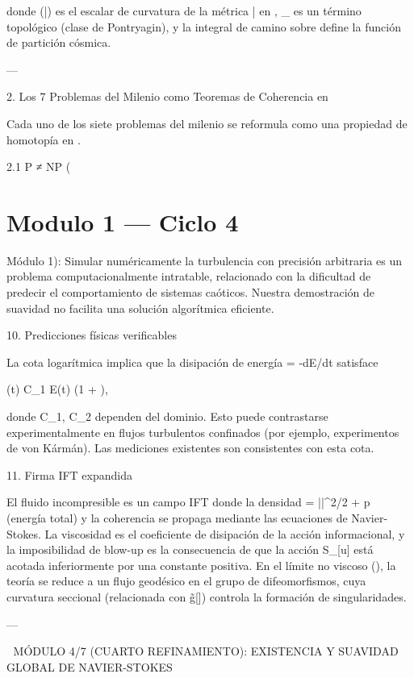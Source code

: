 \documentclass[12pt,twoside]{book}
\begin{document}
donde  (\bar{})  es el escalar de curvatura de la métrica  \bar{}  en   ,  _{}  es un término topológico (clase de Pontryagin), y la integral de camino sobre    define la función de partición cósmica.

---

2. Los 7 Problemas del Milenio como Teoremas de Coherencia en   

Cada uno de los siete problemas del milenio se reformula como una propiedad de homotopía en   .

2.1 P ≠ NP (

\chapter{Modulo 1 — Ciclo 4}
Módulo 1): Simular numéricamente la turbulencia con precisión arbitraria es un problema computacionalmente intratable, relacionado con la dificultad de predecir el comportamiento de sistemas caóticos. Nuestra demostración de suavidad no facilita una solución algorítmica eficiente.

10. Predicciones físicas verificables

La cota logarítmica implica que la disipación de energía \varepsilon = -dE/dt satisface

\varepsilon(t) \le C_1 \nu E(t) \ln\left(1 + \right),

donde C_1, C_2 dependen del dominio. Esto puede contrastarse experimentalmente en flujos turbulentos confinados (por ejemplo, experimentos de von Kármán). Las mediciones existentes son consistentes con esta cota.

11. Firma IFT expandida

El fluido incompresible es un campo IFT donde la densidad \rho = ||^2/2 + p (energía total) y la coherencia se propaga mediante las ecuaciones de Navier-Stokes. La viscosidad \nu es el coeficiente de disipación de la acción informacional, y la imposibilidad de blow-up es la consecuencia de que la acción S_{}[u] está acotada inferiormente por una constante positiva. En el límite no viscoso (\nu {}), la teoría se reduce a un flujo geodésico en el grupo de difeomorfismos, cuya curvatura seccional (relacionada con g̃[\rho]) controla la formación de singularidades.

---


🧬 MÓDULO 4/7 (CUARTO REFINAMIENTO): EXISTENCIA Y SUAVIDAD GLOBAL DE NAVIER-STOKES
\end{document}
